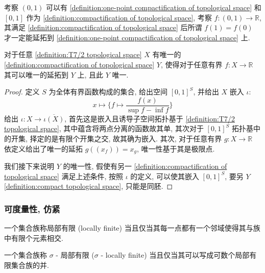 \begin{example}
    考察 \((0,1)\) 可以有 \ref{definition:one-point compactification of topological space} 和 \([0,1]\) 作为 \ref{definition:compactification of topological space},
    考察 \(f : (0,1) \to \mathbb{R}\), 其满足 \ref{definition:compactification of topological space} 后所谓 \(f(1) = f(0)\) 才一定能延拓到 \ref{definition:one-point compactification of topological space} 上.
\end{example}

\begin{theorem}
    \label {theorem:stone-cech's compactification}
    对于任意 \ref{definition:T7/2 topological space} \(X\) 有唯一的 \ref{definition:compactification of topological space} \(Y\),
    使得对于任意有界 \(f : X \to \mathbb{R}\) 其可以唯一的延拓到 \(Y\) 上, 且此 \(Y\) 唯一.

    \begin{proof}
        定义 \(S\) 为全体有界函数构成的集合, 给出空间 \([0,1]^S\), 并给出 \(X\) 嵌入 \(\iota\):
        \[
            x \mapsto \{f \mapsto \frac{f(x)}{\sup f - \inf f}\}
        \]
        给出 \(\iota : X \to \overline{\iota (X)}\), 首先这是嵌入且诱导子空间拓扑基于 \ref{definition:T7/2 topological space},
        其中蕴含将两点分离的函数故其单, 其次对于 \([0,1]^S\) 拓扑基中的开集, 择定的是有限个开集之交, 故其确为嵌入.
        其次, 对于任意有界 \(g : X \to \mathbb{R}\) 依定义给出了唯一的延拓 \(g ((x_f)) = x_g\), 唯一性基于其是极限点.

        我们接下来说明 \(Y\) 的唯一性, 假使有另一 \ref{definition:compactification of topological space} 满足上述条件, 按照 \(\iota\) 的定义,
        可以使其嵌入 \([0,1]^S\), 要另 \(Y\) \ref{definition:compact topological space}, 只能是同胚.
    \end{proof}
\end{theorem}

\subsubsection{可度量性, 仿紧}

\begin{definition}[局部有限]
    \label {definition:locally finite family of topological space}
    一个集合族称局部有限 (locally finite) 当且仅当其每一点都有一个邻域使得其与族中有限个元素相交.
\end{definition}

\begin{definition}
    \label {definition:sigma-locally finite family of topological space}
    一个集合族称 \(\sigma\) - 局部有限 (\(\sigma\) - locally finite) 当且仅当其可以写成可数个局部有限集合族的并.
\end{definition}

